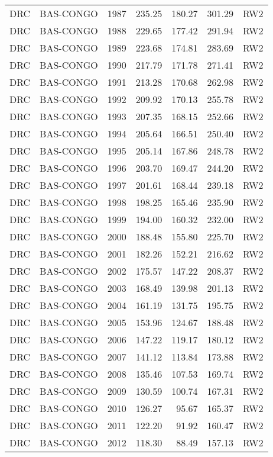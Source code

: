 \begin{longtable}{lllrrrl}
  DRC & BAS-CONGO & 1987 & 235.25 & 180.27 & 301.29 & RW2 \\ 
  DRC & BAS-CONGO & 1988 & 229.65 & 177.42 & 291.94 & RW2 \\ 
  DRC & BAS-CONGO & 1989 & 223.68 & 174.81 & 283.69 & RW2 \\ 
  DRC & BAS-CONGO & 1990 & 217.79 & 171.78 & 271.41 & RW2 \\ 
  DRC & BAS-CONGO & 1991 & 213.28 & 170.68 & 262.98 & RW2 \\ 
  DRC & BAS-CONGO & 1992 & 209.92 & 170.13 & 255.78 & RW2 \\ 
  DRC & BAS-CONGO & 1993 & 207.35 & 168.15 & 252.66 & RW2 \\ 
  DRC & BAS-CONGO & 1994 & 205.64 & 166.51 & 250.40 & RW2 \\ 
  DRC & BAS-CONGO & 1995 & 205.14 & 167.86 & 248.78 & RW2 \\ 
  DRC & BAS-CONGO & 1996 & 203.70 & 169.47 & 244.20 & RW2 \\ 
  DRC & BAS-CONGO & 1997 & 201.61 & 168.44 & 239.18 & RW2 \\ 
  DRC & BAS-CONGO & 1998 & 198.25 & 165.46 & 235.90 & RW2 \\ 
  DRC & BAS-CONGO & 1999 & 194.00 & 160.32 & 232.00 & RW2 \\ 
  DRC & BAS-CONGO & 2000 & 188.48 & 155.80 & 225.70 & RW2 \\ 
  DRC & BAS-CONGO & 2001 & 182.26 & 152.21 & 216.62 & RW2 \\ 
  DRC & BAS-CONGO & 2002 & 175.57 & 147.22 & 208.37 & RW2 \\ 
  DRC & BAS-CONGO & 2003 & 168.49 & 139.98 & 201.13 & RW2 \\ 
  DRC & BAS-CONGO & 2004 & 161.19 & 131.75 & 195.75 & RW2 \\ 
  DRC & BAS-CONGO & 2005 & 153.96 & 124.67 & 188.48 & RW2 \\ 
  DRC & BAS-CONGO & 2006 & 147.22 & 119.17 & 180.12 & RW2 \\ 
  DRC & BAS-CONGO & 2007 & 141.12 & 113.84 & 173.88 & RW2 \\ 
  DRC & BAS-CONGO & 2008 & 135.46 & 107.53 & 169.74 & RW2 \\ 
  DRC & BAS-CONGO & 2009 & 130.59 & 100.74 & 167.31 & RW2 \\ 
  DRC & BAS-CONGO & 2010 & 126.27 & 95.67 & 165.37 & RW2 \\ 
  DRC & BAS-CONGO & 2011 & 122.20 & 91.92 & 160.47 & RW2 \\ 
  DRC & BAS-CONGO & 2012 & 118.30 & 88.49 & 157.13 & RW2 \\ 

\end{longtable}
